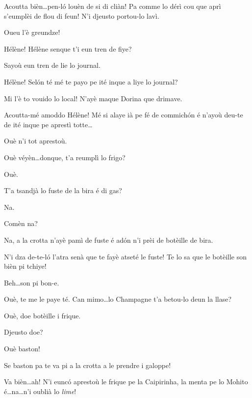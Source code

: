 \begin{drama}
\Bertaspeaks Acoutta bièn\ldots pen-l\'o louèn de si di cliàn! Pa comme lo dérì cou que aprì s'eumplèi de flou di feun! N'i djeusto portou-lo lavì.


\Dorinaspeaks{} Oueu l'è greundze!

\Bertaspeaks{} Hélène! Hélène senque t'i eun tren de fiye?


\Helenespeaks{} Sayoù eun tren de lie lo journal.

\Bertaspeaks{} Hélène! Sel\'on té mé te payo pe ité inque a liye lo journal?

\Helenespeaks Mi l'è to vouido lo local! N'ayè maque Dorina que drimave.

\Bertaspeaks Acoutta-mé amoddo Hélène! Mé si alaye ià pe fé de commich\'on é n'ayoù deu-te de ité inque pe aprestì totte\ldots

\Helenespeaks Ouè n'i tot aprestoù.

\Bertaspeaks Ouè véyèn\ldots donque, t'a reumplì lo frigo?

\Helenespeaks Ouè.

\Bertaspeaks T'a tsandjà lo fuste de la bira é di gas?

\Helenespeaks Na. 

\Bertaspeaks Comèn na?

\Helenespeaks Na, a la crotta n'ayè pamì de fuste é ad\'on n'i prèi de botèille de bira.

\Bertaspeaks N'i dza de-te-l\'o l'atra senà que te fayè atseté le fuste! Te lo sa que le botèille son bièn pi tchiye!

\Helenespeaks{} Beh\ldots son pi bon-e.

\Bertaspeaks Ouè, te me le paye té. Can mimo\ldots lo Champagne t'a betou-lo deun la llase? 

\Helenespeaks{} Ouè, doe botèille i frique.

\Bertaspeaks Djeusto doe?

\Helenespeaks Ouè baston!

\Bertaspeaks Se baston pa te va pi a la crotta a le prendre i galoppe!

\Helenespeaks Va bièn\ldots ah! N'i eunc\'o aprestoù le frique pe la Caipirinha, la menta pe lo Mohito é\ldots na\ldots n'i oublià lo \textit{lime}!


\end{drama}
